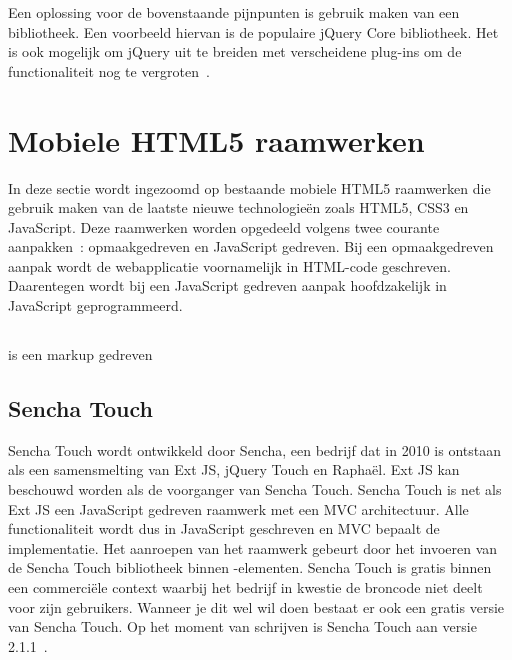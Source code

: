 Een oplossing voor de bovenstaande pijnpunten is gebruik maken van een bibliotheek. 
Een voorbeeld hiervan is de populaire jQuery Core bibliotheek. 
Het is ook mogelijk om jQuery uit te breiden met verscheidene plug-ins om de functionaliteit nog te vergroten~\cite{McFarland2011}.



\section{Mobiele HTML5 raamwerken}
\label{sec:mobiele-html5-raamwerken}

In deze sectie wordt ingezoomd op bestaande mobiele HTML5 raamwerken die gebruik maken van de laatste nieuwe technologieën zoals HTML5, CSS3 en JavaScript.
Deze raamwerken worden opgedeeld volgens twee courante aanpakken~\cite{Oeflman2011}: opmaakgedreven en JavaScript gedreven. Bij een opmaakgedreven aanpak wordt de webapplicatie voornamelijk in HTML-code geschreven. Daarentegen wordt bij een JavaScript gedreven aanpak hoofdzakelijk in JavaScript geprogrammeerd.


\subsection{\jqm} %
\jqm{} is een markup gedreven 

\subsection{Sencha Touch}%
Sencha Touch wordt ontwikkeld door Sencha,  een bedrijf dat in 2010 is ontstaan als een samensmelting van Ext JS,  jQuery Touch en Raphaël.
Ext JS kan beschouwd worden als de voorganger van Sencha Touch. 
Sencha Touch is net als Ext JS een JavaScript gedreven raamwerk met een MVC architectuur.
Alle functionaliteit wordt dus in JavaScript geschreven en MVC bepaalt de implementatie.
Het aanroepen van het raamwerk gebeurt door het invoeren van de Sencha Touch bibliotheek binnen -elementen.
Sencha Touch is gratis binnen een commerciële context waarbij het bedrijf in kwestie de broncode niet deelt voor zijn gebruikers.  
Wanneer je dit wel wil doen bestaat er ook een gratis  versie van Sencha Touch.
Op het moment van schrijven is Sencha Touch aan versie 2.1.1~\cite{Inc.}. 

